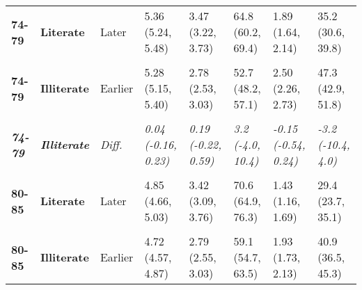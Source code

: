 \begin{table}[!h]
{{\begin{tabular}[t]{>{}l>{}lllllll}
\cmidrule{1-8}
\textbf{74-79} & \textbf{Literate} & Later & 5.36 (5.24, 5.48) & 3.47 (3.22, 3.73) & 64.8 (60.2, 69.4) & 1.89 (1.64, 2.14) & 35.2 (30.6, 39.8)\\
\cmidrule{1-8}
\em{\textbf{\cellcolor{gray!10}{74-79}}} & \em{\textbf{\cellcolor{gray!10}{Literate}}} & \em{\cellcolor{gray!10}{Diff.}} & \em{\cellcolor{gray!10}{0.02 (-0.14, 0.18)}} & \em{\cellcolor{gray!10}{0.47 (0.15, 0.79)**}} & \em{\cellcolor{gray!10}{8.6 (2.7, 14.5)**}} & \em{\cellcolor{gray!10}{-0.45 (-0.78, -0.12)**}} & \em{\cellcolor{gray!10}{-8.6 (-14.5, -2.7)**}}\\
\cmidrule{1-8}
\textbf{74-79} & \textbf{Illiterate} & Earlier & 5.28 (5.15, 5.40) & 2.78 (2.53, 3.03) & 52.7 (48.2, 57.1) & 2.50 (2.26, 2.73) & 47.3 (42.9, 51.8)\\
\cmidrule{1-8}
\textbf{\cellcolor{gray!10}{74-79}} & \textbf{\cellcolor{gray!10}{Illiterate}} & \cellcolor{gray!10}{Later} & \cellcolor{gray!10}{5.31 (5.16, 5.46)} & \cellcolor{gray!10}{2.97 (2.65, 3.28)} & \cellcolor{gray!10}{55.8 (50.1, 61.6)} & \cellcolor{gray!10}{2.35 (2.04, 2.66)} & \cellcolor{gray!10}{44.2 (38.4, 49.9)}\\
\cmidrule{1-8}
\em{\textbf{74-79}} & \em{\textbf{Illiterate}} & \em{Diff.} & \em{0.04 (-0.16, 0.23)} & \em{0.19 (-0.22, 0.59)} & \em{3.2 (-4.0, 10.4)} & \em{-0.15 (-0.54, 0.24)} & \em{-3.2 (-10.4, 4.0)}\\
\cmidrule{1-8}
\textbf{\cellcolor{gray!10}{80-85}} & \textbf{\cellcolor{gray!10}{Literate}} & \cellcolor{gray!10}{Earlier} & \cellcolor{gray!10}{4.80 (4.63, 4.98)} & \cellcolor{gray!10}{2.72 (2.45, 3.00)} & \cellcolor{gray!10}{56.7 (51.2, 62.3)} & \cellcolor{gray!10}{2.08 (1.79, 2.37)} & \cellcolor{gray!10}{43.3 (37.7, 48.8)}\\
\cmidrule{1-8}
\textbf{80-85} & \textbf{Literate} & Later & 4.85 (4.66, 5.03) & 3.42 (3.09, 3.76) & 70.6 (64.9, 76.3) & 1.43 (1.16, 1.69) & 29.4 (23.7, 35.1)\\
\cmidrule{1-8}
\em{\textbf{\cellcolor{gray!10}{80-85}}} & \em{\textbf{\cellcolor{gray!10}{Literate}}} & \em{\cellcolor{gray!10}{Diff.}} & \em{\cellcolor{gray!10}{0.04 (-0.22, 0.30)}} & \em{\cellcolor{gray!10}{0.70 (0.26, 1.13)**}} & \em{\cellcolor{gray!10}{13.9 (5.9, 21.8)***}} & \em{\cellcolor{gray!10}{-0.65 (-1.05, -0.26)**}} & \em{\cellcolor{gray!10}{-13.9 (-21.8, -5.9)***}}\\
\cmidrule{1-8}
\textbf{80-85} & \textbf{Illiterate} & Earlier & 4.72 (4.57, 4.87) & 2.79 (2.55, 3.03) & 59.1 (54.7, 63.5) & 1.93 (1.73, 2.13) & 40.9 (36.5, 45.3)\\

\end{tabular}}}
\end{table}
